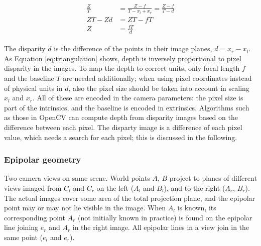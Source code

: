 \begin{align} \label{eq:triangulation} \begin{split}
	\frac{Z}{T} &= \frac{Z-f}{T - x_l + x_r} = \frac{Z-f}{T - d}\\
	ZT - Zd &= ZT - fT\\
	Z &= \frac{fT}{d}
\end{split} \end{align}

The disparity $d$ is the difference of the points in their image planes, $d = x_r - x_l$.
As Equation \ref{eq:triangulation} shows, depth is inversely proportional to pixel disparity in the images.
To map the depth to correct units, only focal length $f$ and the baseline $T$ are needed additionally; when using pixel coordinates instead of physical units in $d$, also the pixel size should be taken into account in scaling $x_l$ and $x_r$.
All of these are encoded in the camera parameters: the pixel size is part of the intrinsics, and the baseline is encoded in extrinsics.
Algorithms such as those in OpenCV \cite{opencv} can compute depth from disparity images based on the difference between each pixel.
The disparty image is a difference of each pixel value, which needs a search for each pixel;
this is discussed in the following.


\subsubsection{Epipolar geometry} %

{Two camera views on same scene.
World points $A$, $B$ project to planes of different views imaged from $C_l$ and $C_r$ on the left ($A_l$ and $B_l$), and to the right ($A_r$, $B_r$).
The actual images cover some area of the total projection plane, and the epipolar point may or may not lie visible in the image.
When $A_l$ is known, its corresponding point $A_r$ (not initially known in practice) is found on the epipolar line joining $e_r$ and $A_r$ in the right image.
All epipolar lines in a view join in the same point ($e_l$ and $e_r$).}

